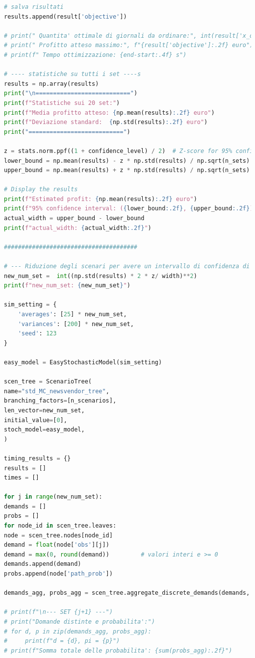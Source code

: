 \documentclass[a4paper,12pt]{article}
\begin{document}
\begin{lstlisting}[language=python,caption={Main of Newvendor problem},label={lst:main-nv}]
# salva risultati
results.append(result['objective'])

# print(" Quantita' ottimale di giornali da ordinare:", int(result['x_opt']))
# print(" Profitto atteso massimo:", f"{result['objective']:.2f} euro")
# print(f" Tempo ottimizzazione: {end-start:.4f} s")

# ---- statistiche su tutti i set ----s
results = np.array(results)
print("\n===========================")
print(f"Statistiche sui 20 set:")
print(f"Media profitto atteso: {np.mean(results):.2f} euro")
print(f"Deviazione standard:  {np.std(results):.2f} euro")
print("===========================")

z = stats.norm.ppf((1 + confidence_level) / 2)  # Z-score for 95% confidence interval
lower_bound = np.mean(results) - z * np.std(results) / np.sqrt(n_sets)
upper_bound = np.mean(results) + z * np.std(results) / np.sqrt(n_sets)

# Display the results
print(f"Estimated profit: {np.mean(results):.2f} euro")
print(f"95% confidence interval: ({lower_bound:.2f}, {upper_bound:.2f})")
actual_width = upper_bound - lower_bound
print(f"actual_width: {actual_width:.2f}")

######################################

# --- Riduzione degli scenari per avere un intervallo di confidenza di 10 euro ---
new_num_set =  int((np.std(results) * 2 * z/ width)**2)
print(f"new_num_set: {new_num_set}")

sim_setting = {
	'averages': [25] * new_num_set,
	'variances': [200] * new_num_set,
	'seed': 123
}

easy_model = EasyStochasticModel(sim_setting)

scen_tree = ScenarioTree(
name="std_MC_newsvendor_tree",
branching_factors=[n_scenarios], 
len_vector=new_num_set,
initial_value=[0],
stoch_model=easy_model,
)

timing_results = {}
results = []
times = []

for j in range(new_num_set):
demands = []
probs = []
for node_id in scen_tree.leaves:
node = scen_tree.nodes[node_id]
demand = float(node['obs'][j])         
demand = max(0, round(demand))         # valori interi e >= 0
demands.append(demand)
probs.append(node['path_prob'])

demands_agg, probs_agg = scen_tree.aggregate_discrete_demands(demands, probs)

# print(f"\n--- SET {j+1} ---")
# print("Domande distinte e probabilita':")
# for d, p in zip(demands_agg, probs_agg):
#     print(f"d = {d}, pi = {p}")
# print(f"Somma totale delle probabilita': {sum(probs_agg):.2f}")


\end{lstlisting}
\end{document}
